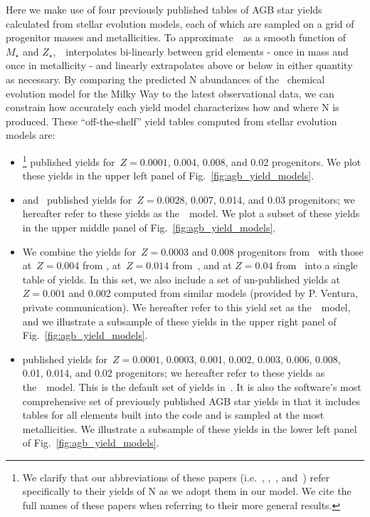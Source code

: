 \documentclass[ms.tex]{subfiles}
\begin{document}
Here we make use of four previously published tables of AGB star yields
calculated from stellar evolution models, each of which are sampled on a grid
of progenitor masses and metallicities.
To approximate~~as a smooth function of~$M_\star$ and
$Z_\star$,~\vice~interpolates bi-linearly between grid elements - once in
mass and once in metallicity - and linearly extrapolates above or below in
either quantity as necessary.
By comparing the predicted N abundances of the~\citet{Johnson2021} chemical
evolution model for the Milky Way to the latest observational data, we can
constrain how accurately each yield model characterizes how and where N is
produced.
These ``off-the-shelf'' yield tables computed from stellar evolution models are:
\begin{itemize}
	\item[\textbf{1.}] \citet[][hereafter~\karakasten]{Karakas2010}\footnote{
		We clarify that our abbreviations of these papers (i.e.~\karakasten,
		\karakas,~\ventura, and~\cristallo) refer specifically to their yields
		of N as we adopt them in our model.
		We cite the full names of these papers when referring to their more
		general results.
	} published yields for~$Z = 0.0001$, 0.004, 0.008, and 0.02 progenitors.
	We plot these yields in the upper left panel of 
	Fig.~\ref{fig:agb_yield_models}.

	\item[\textbf{2.}] \citet{Karakas2016} and~\citet{Karakas2018} published
	yields for~$Z = 0.0028$, 0.007, 0.014, and 0.03 progenitors; we hereafter
	refer to these yields as the~\karakas~model.
	We plot a subset of these yields in the upper middle panel of
	Fig.~\ref{fig:agb_yield_models}.

	\item[\textbf{3.}] We combine the yields for~$Z = 0.0003$ and 0.008
	progenitors from~\citet{Ventura2013} with those at~$Z = 0.004$ from
	\citet{Ventura2014}, at~$Z = 0.014$ from~\citet{Ventura2018}, and at
	$Z = 0.04$ from~\citet{Ventura2020} into a single table of yields.
	In this set, we also include a set of un-published yields at~$Z = 0.001$
	and 0.002 computed from similar models (provided by P. Ventura, private
	communication).
	We hereafter refer to this yield set as the~\ventura~model, and we
	illustrate a subsample of these yields in the upper right panel of
	Fig.~\ref{fig:agb_yield_models}.

	\item[\textbf{4.}] \citet{Cristallo2011, Cristallo2015} published yields
	for~$Z = 0.0001$, 0.0003, 0.001, 0.002, 0.003, 0.006, 0.008, 0.01, 0.014,
	and 0.02 progenitors; we hereafter refer to these yields as
	the~\cristallo~model.
	This is the default set of yields in~\vice.
	It is also the software's most comprehensive set of previously published
	AGB star yields in that it includes tables for all elements built into the
	code and is sampled at the most metallicities.
	We illustrate a subsample of these yields in the lower left panel of
	Fig.~\ref{fig:agb_yield_models}.
\end{itemize}
\end{document}
